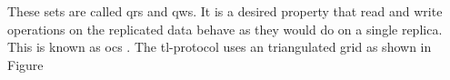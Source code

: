These sets are called \glspl{qr} and \glspl{qw}.
It is a desired property that read and write operations on the replicated data
behave as they would do on a single replica. 
This is known as \gls{ocs} \cite{BHG87:ccr}.
The \gls{tl}-protocol uses an triangulated grid as shown in Figure

